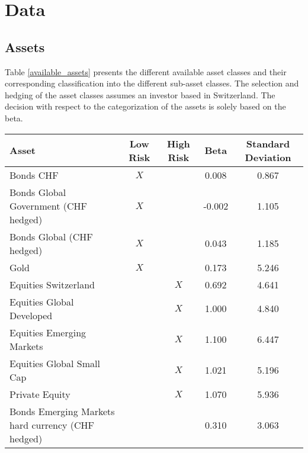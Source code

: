 \section{Data}

\subsection{Assets}

Table \ref{available_assets} presents the different available asset classes and their corresponding classification into the different sub-asset classes. The selection and hedging of the asset classes assumes an investor based in Switzerland. The decision with respect to the categorization of the assets is solely based on the beta. 



\begin{table}[h!]
\centering
\begin{tabular}{@{}lcccc@{}}
\toprule
\textbf{Asset}                                    & \textbf{Low Risk} & \textbf{High Risk} & \textbf{Beta} & \textbf{Standard Deviation} \\ \midrule
Bonds CHF                                         & $X$               &              &  0.008    &  0.867   \\
Bonds Global Government (CHF hedged)              & $X$               &              &  -0.002    &  1.105   \\
Bonds Global (CHF hedged)                         & $X$               &              &   0.043   &  1.185   \\
Gold                                              & $X$               &              &  0.173    &  5.246   \\
Equities Switzerland                              &                   & $X$          &  0.692    &   4.641  \\
Equities Global Developed                          &                   & $X$          &  1.000    &   4.840  \\
Equities Emerging Markets                         &                   & $X$          &  1.100    &   6.447  \\
Equities Global Small Cap                         &                   & $X$          &  1.021    &   5.196  \\
Private Equity                                    &                   & $X$          &  1.070    &   5.936  \\
Bonds Emerging Markets hard currency (CHF hedged) &                   &              &  0.310   &   3.063  \\

\end{tabular}
\end{table}
